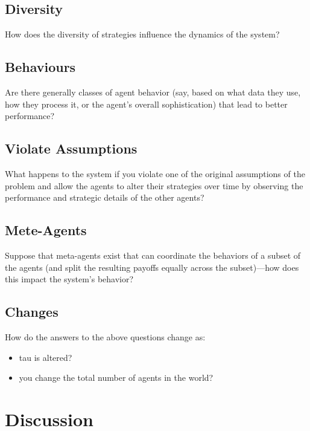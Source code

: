 \documentclass[]{article}
\begin{document}
\subsection{Diversity}How does the diversity of strategies influence the dynamics of the system?
\subsection{Behaviours}Are there generally classes of agent behavior (say, based on what data they use, how they process it, or the agent's overall sophistication) that lead to better performance?
\subsection{Violate Assumptions}What happens to the system if you violate one of the original assumptions of the problem and allow the agents to alter their strategies over time by observing the performance and strategic details of the other agents?
\subsection{Mete-Agents}Suppose that meta-agents exist that can coordinate the behaviors of a subset of the agents (and split the resulting payoffs equally across the subset)---how does this impact the system's behavior?
\subsection{Changes}How do the answers to the above questions change as:
\begin{itemize}
	\item tau is altered?
	\item you change the total number of agents in the world?
\end{itemize}

\section{Discussion}

\medskip



\end{document}
